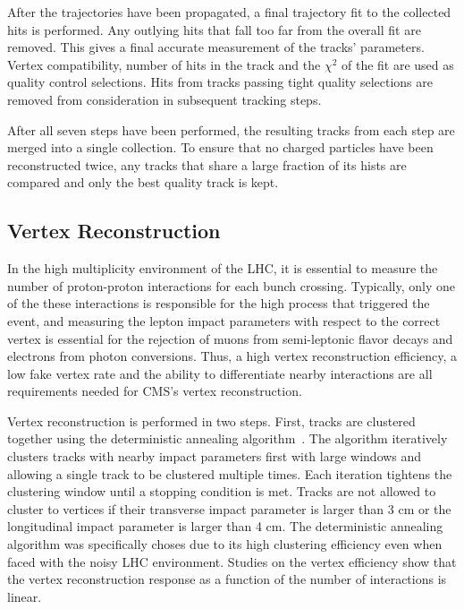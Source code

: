 After the trajectories have been propagated, a final trajectory fit to the
collected hits is performed. Any outlying hits that fall too far from the
overall fit are removed. This gives a final accurate measurement of the tracks'
parameters. Vertex compatibility, number of hits in the track and the $\chi^2$
of the fit are used as quality control selections. Hits from tracks passing
tight quality selections are removed from consideration in subsequent tracking
steps.

After all seven steps have been performed, the resulting tracks from each step
are merged into a single collection. To ensure that no charged particles have
been reconstructed twice, any tracks that share a large fraction of its hists
are compared and only the best quality track is kept.

\subsection{Vertex Reconstruction}
\label {sec:cms_vertex}
In the high multiplicity environment of the LHC, it is essential to measure
the number of proton-proton interactions for each bunch crossing. Typically,
only one of the these interactions is responsible for the high \pt process
that triggered the event, and measuring the lepton impact parameters with
respect to the correct vertex is essential for the rejection of muons from
semi-leptonic flavor decays and electrons from photon conversions. Thus, a high
vertex reconstruction efficiency, a low fake vertex rate and the ability to
differentiate nearby interactions are all requirements needed for CMS's vertex
reconstruction.

Vertex reconstruction is performed in two steps. First, tracks are clustered
together using the deterministic annealing algorithm~\cite{davtx,dacms}. The
algorithm iteratively clusters tracks with nearby impact parameters first with
large windows and allowing a single track to be clustered multiple times.
Each iteration tightens the clustering window until a stopping condition is
met. Tracks are not allowed to cluster to vertices if their transverse impact
parameter is larger than 3 cm or the longitudinal impact parameter is larger
than 4 cm. The deterministic annealing algorithm was specifically choses due to
its high clustering efficiency even when faced with the noisy LHC environment.
Studies on the vertex efficiency show that the vertex reconstruction response
as a function of the number of interactions is linear.


